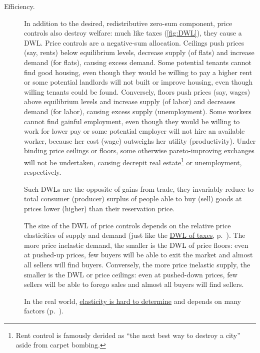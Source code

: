 \begin{description}
	\item[Efficiency.] 
		In addition to the desired, redistributive zero-sum component, price controls also destroy welfare: much like taxes (\autoref{fig:DWL}), they cause a \gls{DWL}. Price controls are a negative-sum allocation. Ceilings push prices (say, rents) below equilibrium levels, decrease supply (of flats) and increase demand (for flats), causing excess demand. Some potential tenants cannot find good housing, even though they would be willing to pay a higher rent or some potential landlords will not built or improve housing, even though willing tenants could be found. Conversely, floors push prices (say, wages) above equilibrium levels and increase supply (of labor) and decreases demand (for labor), causing excess supply (unemployment). Some workers cannot find gainful employment, even though they would be willing to work for lower pay or some potential employer will not hire an available worker, because her cost (wage) outweighs her utility (productivity). Under binding price ceilings or floors, some otherwise pareto-improving exchanges will not be undertaken, causing decrepit real estate\footnote{
			Rent control is famously derided as ``the next best way to destroy a city'' aside from carpet bombing.} 
		or unemployment, respectively. 
		
		Such \glspl{DWL} are the opposite of gains from trade, they invariably reduce to total consumer (producer) surplus of people able to buy (sell) goods at prices lower (higher) than their reservation price.
	
		The size of the \gls{DWL} of price controls depends on the relative price elasticities of supply and demand (just like the \hyperref[sec:minimal-DWL]{\gls{DWL} of taxes}, p.~\pageref{sec:minimal-DWL}).
		The more price inelastic demand, the smaller is the \gls{DWL} of price floors: even at pushed-up prices, few buyers will be able to exit the market and almost all sellers will find buyers. Conversely, the more price inelastic supply, the smaller is the \gls{DWL} or price ceilings: even at pushed-down prices, few sellers will be able to forego sales and almost all buyers will find sellers. 
	
		In the real world, \hyperref[sec:well-determined-incidence]{elasticity is hard to determine} and depends on many factors (p.~\pageref{sec:well-determined-incidence}). 
	

\end{description}
